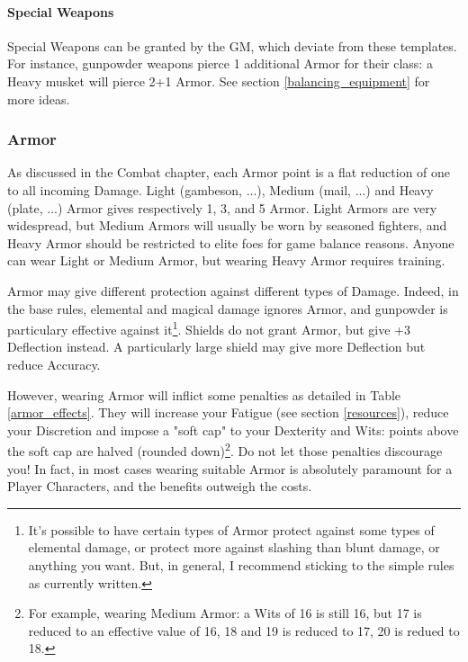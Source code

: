 \paragraph{Special Weapons} 

Special Weapons can be granted by the GM, which deviate from these templates. For instance, gunpowder weapons pierce 1 additional Armor for their class: a Heavy musket will pierce 2+1 Armor. See section \ref{balancing_equipment} for more ideas.

\subsubsection{Armor}

\label{armor}

As discussed in the Combat chapter, each Armor point is a flat reduction of one to all incoming Damage. Light (gambeson, ...), Medium (mail, ...) and Heavy (plate, ...) Armor gives respectively 1, 3, and 5 Armor. Light Armors are very widespread, but Medium Armors will usually be worn by seasoned fighters, and Heavy Armor should be restricted to elite foes for game balance reasons. 
Anyone can wear Light or Medium Armor, but wearing Heavy Armor requires training.

Armor may give different protection against different types of Damage. Indeed, in the base rules, elemental and magical damage ignores Armor, and gunpowder is particulary effective against it\footnote{It's possible to have certain types of Armor protect against some types of elemental damage, or protect more against slashing than blunt damage, or anything you want. But, in general, I recommend sticking to the simple rules as currently written.}. Shields do not grant Armor, but give +3 Deflection instead. A particularly large shield may give more Deflection but reduce Accuracy.

However, wearing Armor will inflict some penalties as detailed in Table \ref{armor_effects}. They will increase your Fatigue (see section \ref{resources}), reduce your Discretion and impose a "soft cap" to your Dexterity and Wits: points above the soft cap are halved (rounded down)\footnote{For example, wearing Medium Armor: a Wits of 16 is still 16, but 17 is reduced to an effective value of 16, 18 and 19 is reduced to 17, 20 is redued to 18.}. Do not let those penalties discourage you! In fact, in most cases wearing suitable Armor is absolutely paramount for a Player Characters, and the benefits outweigh the costs.



